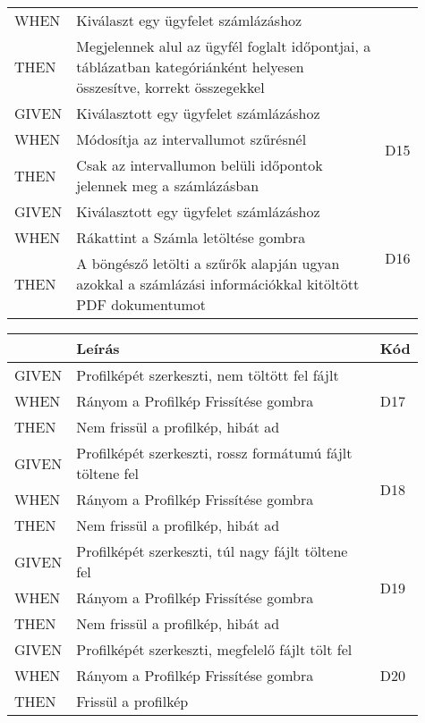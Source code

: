 \begin{table}[H]
\begin{tabular}{|m{0.1\linewidth}|m{0.75\linewidth}|m{0.06\linewidth}|}
		WHEN  & Kiválaszt egy ügyfelet számlázáshoz & \\ \cline{1-2}
		THEN  & Megjelennek alul az ügyfél foglalt időpontjai, a táblázatban kategóriánként helyesen összesítve, korrekt összegekkel & \\ 
		\hline
		GIVEN & Kiválasztott egy ügyfelet számlázáshoz & \multirow{3}{*}{D15} \\ \cline{1-2}
		WHEN  & Módosítja az intervallumot szűrésnél & \\ \cline{1-2}
		THEN  & Csak az intervallumon belüli időpontok jelennek meg a számlázásban  & \\ 
		\hline
		GIVEN & Kiválasztott egy ügyfelet számlázáshoz & \multirow{3}{*}{D16} \\ \cline{1-2}
		WHEN  & Rákattint a Számla letöltése gombra & \\ \cline{1-2}
		THEN  & A böngésző letölti a szűrők alapján ugyan azokkal a számlázási információkkal kitöltött PDF dokumentumot  & \\ 
		\hline
	\end{tabular}
\end{table}

\begin{table}[H]
	\centering
	\begin{tabular}{|m{0.1\linewidth}|m{0.75\linewidth}|m{0.06\linewidth}|}
		\hline
		& \textbf{Leírás} & \textbf{Kód} \\
		\hline
		GIVEN & Profilképét szerkeszti, nem töltött fel fájlt & \multirow{3}{*}{D17} \\ \cline{1-2}
		WHEN  & Rányom a Profilkép Frissítése gombra & \\ \cline{1-2}
		THEN  & Nem frissül a profilkép, hibát ad & \\ 
		\hline
		GIVEN & Profilképét szerkeszti, rossz formátumú fájlt töltene fel & \multirow{3}{*}{D18} \\ \cline{1-2}
		WHEN  & Rányom a Profilkép Frissítése gombra & \\ \cline{1-2}
		THEN  & Nem frissül a profilkép, hibát ad & \\ 
		\hline
		GIVEN & Profilképét szerkeszti, túl nagy fájlt töltene fel & \multirow{3}{*}{D19} \\ \cline{1-2}
		WHEN  & Rányom a Profilkép Frissítése gombra & \\ \cline{1-2}
		THEN  & Nem frissül a profilkép, hibát ad & \\ 
		\hline
		GIVEN & Profilképét szerkeszti, megfelelő fájlt tölt fel & \multirow{3}{*}{D20} \\ \cline{1-2}
		WHEN  & Rányom a Profilkép Frissítése gombra & \\ \cline{1-2}
		THEN  & Frissül a profilkép & \\ 
		\hline
	\end{tabular}
\end{table}
